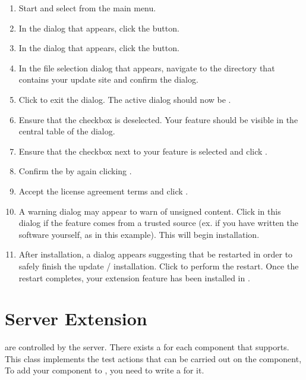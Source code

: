 \begin{enumerate}
\item Start \app{} and select  from the main menu.
\item In the  dialog that appears, click the  button.
\item In the  dialog that appears, click the  button.
\item In the file selection dialog that appears, navigate to the directory that contains your update site and confirm the dialog.
\item Click  to exit the  dialog. 
 The active dialog should now be .
\item Ensure that the  checkbox is deselected.
 Your feature should be visible in the central table of the dialog.
\item Ensure that the checkbox next to your feature is selected and click .
\item Confirm the  by again clicking .
\item Accept the license agreement terms and click .
\item A warning dialog may appear to warn of unsigned content. Click 
  in this dialog if the feature comes from a trusted source (ex. 
 if you have written the software yourself, as in this example). This will
 begin installation.
\item After installation, a dialog appears suggesting that \app{} be restarted
 in order to safely finish the update / installation. Click 
 to perform the restart. Once the restart completes, your extension feature has
 been installed in \app{}.  
\end{enumerate}

\section{\app{} Server Extension}

\gdauts{} are controlled by the server. There exists a \gdtesterclass for each component that
\app{} supports. This class implements the test actions that can be carried out on the component, To add your
component to \app{}, you need to write a \gdtesterclass for it.

